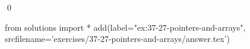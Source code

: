 
\begin{ex}
  \label{ex:37-27-pointers-and-arrays}
  
  \qed
\end{ex}
\begin{python0}
from solutions import *
add(label="ex:37-27-pointers-and-arrays",
    srcfilename='exercises/37-27-pointers-and-arrays/answer.tex')
\end{python0}
